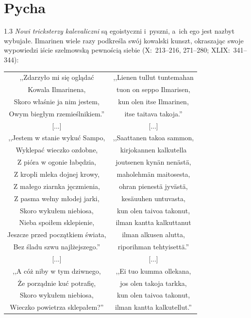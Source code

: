 \documentclass[11pt,a4paper,twoside]{report}
\begin{document}
\section{Pycha}
\begin{spacing}{1.3}
\emph{Nowi tricksterzy kalevaliczni} są egoistyczni i~pyszni, a~ich ego jest nazbyt wybujałe. Ilmarinen wiele razy podkreśla swój kowalski kunszt, okraszając swoje wypowiedzi iście szelmowską pewnością siebie (X:~213--216, 271--280; XLIX:~341--344):
\end{spacing}
{\centering
\small
\begin{longtable}{c c}
,,Zdarzyło mi się oglądać & ,,Lienen tullut tuntemahan\\
Kowala Ilmarinena, & tuon on seppo Ilmarisen,\\
Skoro właśnie ja nim jestem, & kun olen itse Ilmarinen,\\
Owym biegłym rzemieślnikiem.'' & itse taitava takoja.''\\
{[...]} & {[...]}\\
,,Jestem w stanie wykuć Sampo, & ,,Saattanen takoa sammon,\\
Wyklepać wieczko ozdobne, & kirjokannen kalkutella\\
Z pióra w ogonie łabędzia, & joutsenen kynän nenästä,\\
Z kropli mleka dojnej krowy, & maholehmän maitosesta,\\
Z małego ziarnka jęczmienia, & ohran pienestä jyvästä,\\
Z pasma wełny młodej jarki, & kesäuuhen untuvasta,\\
Skoro wykułem niebiosa, & kun olen taivoa takonut,\\
Nieba spoiłem sklepienie, & ilman kantta kalkuttanut\\
Jeszcze przed początkiem świata, & ilman alkusen alutta,\\
Bez śladu szwu najlżejszego.'' & riporihman tehtyisettä.''\\
{[...]} & {[...]}\\
,,A cóż niby w tym dziwnego, & ,,Ei tuo kumma ollekana,\\
Że porządnie kuć potrafię, & jos olen takoja tarkka,\\
Skoro wykułem niebiosa, & kun olen taivoa takonut,\\
Wieczko powietrza sklepałem?'' & ilman kantta kalkutellut.''\\
\end{longtable}
}
\end{document}

